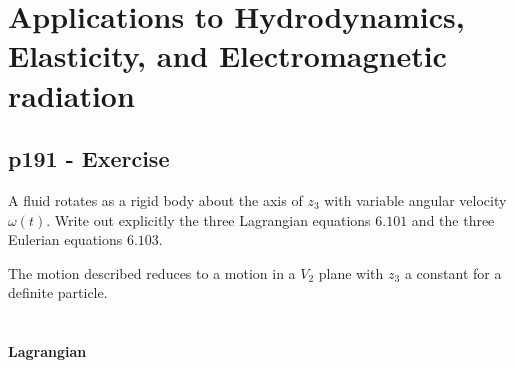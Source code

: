 \setcounter{chapter}{5}
\chapter{Applications to Hydrodynamics, Elasticity, and Electromagnetic radiation}
\pagebreak[4]
\section{p191 - Exercise}
\begin{tcolorbox}
A fluid rotates as a rigid body about the axis of $z_3$ with variable angular velocity $\omega(t)$. Write out explicitly the three Lagrangian equations $\mathbf{6.101}$ and the three Eulerian equations $\mathbf{6.103}$.
\end{tcolorbox}
The motion described reduces to a motion in a $V_2$ plane with $z_3$ a constant for a definite particle.\\\\\\
\textbf{Lagrangian}\\

